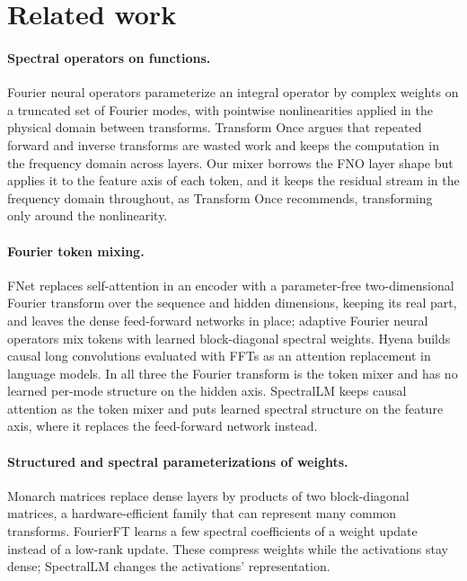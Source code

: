 
\section{Related work}
\label{sec:related}

\paragraph{Spectral operators on functions.} Fourier neural operators
\citep{li2020fno} parameterize an integral operator by complex weights on a
truncated set of Fourier modes, with pointwise nonlinearities applied in the
physical domain between transforms. Transform Once \citep{poli2022transformonce}
argues that repeated forward and inverse transforms are wasted work and keeps
the computation in the frequency domain across layers. Our mixer borrows the
FNO layer shape but applies it to the feature axis of each token, and it
keeps the residual stream in the frequency domain throughout, as Transform
Once recommends, transforming only around the nonlinearity.

\paragraph{Fourier token mixing.} FNet \citep{leethorp2021fnet} replaces
self-attention in an encoder with a parameter-free two-dimensional Fourier
transform over the sequence and hidden dimensions, keeping its real part, and
leaves the dense feed-forward networks in place; adaptive Fourier neural
operators \citep{guibas2021afno} mix tokens with learned block-diagonal
spectral weights. Hyena \citep{poli2023hyena} builds causal long convolutions
evaluated with FFTs as an attention replacement in language models. In all
three the Fourier transform is the token mixer and has no learned per-mode
structure on the hidden axis. SpectralLM keeps causal attention as the token
mixer and puts learned spectral structure on the feature axis, where it
replaces the feed-forward network instead.

\paragraph{Structured and spectral parameterizations of weights.} Monarch
matrices \citep{dao2022monarch} replace dense layers by products of two
block-diagonal matrices, a hardware-efficient family that can represent many
common transforms. FourierFT \citep{gao2024fourierft} learns a few spectral
coefficients of a weight update instead of a low-rank update. These compress
weights while the activations stay dense; SpectralLM changes the activations'
representation.

